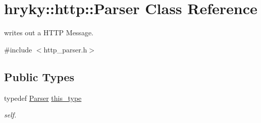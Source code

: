 \hypertarget{classhryky_1_1http_1_1_parser}{\section{hryky\-:\-:http\-:\-:Parser Class Reference}
\label{classhryky_1_1http_1_1_parser}
}


writes out a H\-T\-T\-P Message.  




{\ttfamily \#include $<$http\-\_\-parser.\-h$>$}

\subsection*{Public Types}
\begin{DoxyCompactItemize}
\item 
\hypertarget{classhryky_1_1http_1_1_parser_ad7998597a6ec4d6f9e672e8c4974b117}{typedef \hyperlink{classhryky_1_1http_1_1_parser}{Parser} \hyperlink{classhryky_1_1http_1_1_parser_ad7998597a6ec4d6f9e672e8c4974b117}{this\-\_\-type}}\label{classhryky_1_1http_1_1_parser_ad7998597a6ec4d6f9e672e8c4974b117}

\begin{DoxyCompactList}\small\item\em self. \end{DoxyCompactList}\end{DoxyCompactItemize}

